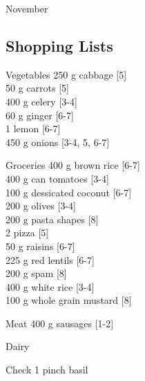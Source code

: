 \begin{menu}{November}
    \subsection*{Shopping Lists}
      \begin{shoppinglist}{Vegetables}
      250 g cabbage {\scriptsize[5]}\\
      50 g carrots {\scriptsize[5]}\\
      400 g celery {\scriptsize[3-4]}\\
      60 g ginger {\scriptsize[6-7]}\\
      1  lemon {\scriptsize[6-7]}\\
      450 g onions {\scriptsize[3-4, 5, 6-7]}\\
      \end{shoppinglist}%
      \begin{shoppinglist}{Groceries}
      400 g brown rice {\scriptsize[6-7]}\\
      400 g can tomatoes {\scriptsize[3-4]}\\
      100 g dessicated coconut {\scriptsize[6-7]}\\
      200 g olives {\scriptsize[3-4]}\\
      200 g pasta shapes {\scriptsize[8]}\\
      2  pizza {\scriptsize[5]}\\
      50 g raisins {\scriptsize[6-7]}\\
      225 g red lentils {\scriptsize[6-7]}\\
      200 g spam {\scriptsize[8]}\\
      400 g white rice {\scriptsize[3-4]}\\
      100 g whole grain mustard {\scriptsize[8]}\\
      \end{shoppinglist}%
      \par\vfil %
      \begin{shoppinglist}{Meat}
      400 g sausages {\scriptsize[1-2]}\\
      \end{shoppinglist}%
      \begin{shoppinglist}{Dairy}
      \end{shoppinglist}%
      \par\vfil %
      \vfil\clearpage %
      \begin{shoppinglist}{Check}
      1 pinch basil \\

\end{shoppinglist}
\end{menu}
